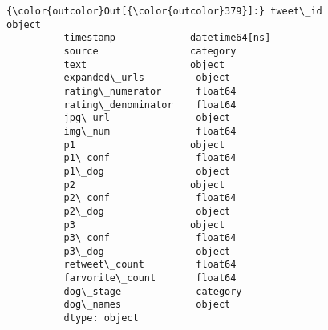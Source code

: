 \documentclass[11pt]{article}
\begin{document}
\begin{Verbatim}[commandchars=\\\{\}]
{\color{outcolor}Out[{\color{outcolor}379}]:} tweet\_id              object        
          timestamp             datetime64[ns]
          source                category      
          text                  object        
          expanded\_urls         object        
          rating\_numerator      float64       
          rating\_denominator    float64       
          jpg\_url               object        
          img\_num               float64       
          p1                    object        
          p1\_conf               float64       
          p1\_dog                object        
          p2                    object        
          p2\_conf               float64       
          p2\_dog                object        
          p3                    object        
          p3\_conf               float64       
          p3\_dog                object        
          retweet\_count         float64       
          farvorite\_count       float64       
          dog\_stage             category      
          dog\_names             object        
          dtype: object
\end{Verbatim}
            
\end{document}
